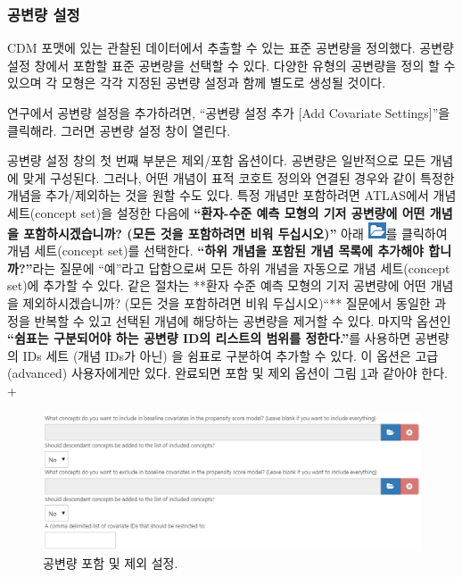 \documentclass[11pt]{book}
\theoremstyle{definition}
\theoremstyle{definition}
\theoremstyle{definition}
\theoremstyle{remark}
\begin{document}
\subsubsection*{공변량 설정}\label{--1}

CDM 포맷에 있는 관찰된 데이터에서 추출할 수 있는 표준 공변량을 정의했다.
공변량 설정 창에서 포함할 표준 공변량을 선택할 수 있다. 다양한 유형의
공변량을 정의 할 수 있으며 각 모형은 각각 지정된 공변량 설정과 함께
별도로 생성될 것이다.

연구에서 공변량 설정을 추가하려면, ``공변량 설정 추가 {[}Add Covariate
Settings{]}''을 클릭해라. 그러면 공변량 설정 창이 열린다.

공변량 설정 창의 첫 번째 부분은 제외/포함 옵션이다. 공변량은 일반적으로
모든 개념에 맞게 구성된다. 그러나, 어떤 개념이 표적 코호트 정의와 연결된
경우와 같이 특정한 개념을 추가/제외하는 것을 원할 수도 있다. 특정 개념만
포함하려면 ATLAS에서 개념 세트(concept set)을 설정한 다음에
\textbf{``환자-수준 예측 모형의 기저 공변량에 어떤 개념을
포함하시겠습니까? (모든 것을 포함하려면 비워 두십시오)''} 아래
\includegraphics{images/PopulationLevelEstimation/open.png}를 클릭하여
개념 세트(concept set)를 선택한다. \textbf{``하위 개념을 포함된 개념
목록에 추가해야 합니까?''}라는 질문에 ``예''라고 답함으로써 모든 하위
개념을 자동으로 개념 세트(concept set)에 추가할 수 있다. 같은 절차는
**환자 수준 예측 모형의 기저 공변량에 어떤 개념을 제외하시겠습니까?
(모든 것을 포함하려면 비워 두십시오)``** 질문에서 동일한 과정을 반복할
수 있고 선택된 개념에 해당하는 공변량을 제거할 수 있다. 마지막 옵션인
\textbf{``쉼표는 구분되어야 하는 공변량 ID의 리스트의 범위를
정한다.''}를 사용하면 공변량의 IDs 세트 (개념 IDs가 아닌) 을 쉼표로
구분하여 추가할 수 있다. 이 옵션은 고급(advanced) 사용자에게만 있다.
완료되면 포함 및 제외 옵션이 그림 \ref{fig:covariateSettings1}과 같아야
한다. +

\begin{figure}

{\centering \includegraphics[width=1\linewidth]{images/PatientLevelPrediction/covariateSettings1} 

}

\caption{공변량 포함 및 제외 설정.}\label{fig:covariateSettings1}
\end{figure}
\end{document}
